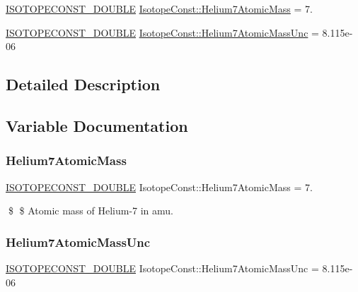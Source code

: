\begin{DoxyCompactItemize}
\item 
\mbox{\hyperlink{group___isotope_const-_macros_ga8f45a7272ce02c0b4c65c44636ed719a}{I\+S\+O\+T\+O\+P\+E\+C\+O\+N\+S\+T\+\_\+\+D\+O\+U\+B\+LE}} \mbox{\hyperlink{group___isotope_const-_helium-_he7_gae9b33ba21d0483be0a5607304cfce937}{Isotope\+Const\+::\+Helium7\+Atomic\+Mass}} = 7.
\item 
\mbox{\hyperlink{group___isotope_const-_macros_ga8f45a7272ce02c0b4c65c44636ed719a}{I\+S\+O\+T\+O\+P\+E\+C\+O\+N\+S\+T\+\_\+\+D\+O\+U\+B\+LE}} \mbox{\hyperlink{group___isotope_const-_helium-_he7_ga6b1357a01df5c09a990eab441534dc7e}{Isotope\+Const\+::\+Helium7\+Atomic\+Mass\+Unc}} = 8.\+115e-\/06
\end{DoxyCompactItemize}


\subsection{Detailed Description}


\subsection{Variable Documentation}
\mbox{\label{group___isotope_const-_helium-_he7_gae9b33ba21d0483be0a5607304cfce937}} 
\subsubsection{\texorpdfstring{Helium7\+Atomic\+Mass}{Helium7AtomicMass}}
{\footnotesize\ttfamily \mbox{\hyperlink{group___isotope_const-_macros_ga8f45a7272ce02c0b4c65c44636ed719a}{I\+S\+O\+T\+O\+P\+E\+C\+O\+N\+S\+T\+\_\+\+D\+O\+U\+B\+LE}} Isotope\+Const\+::\+Helium7\+Atomic\+Mass = 7.}

\$ \$ Atomic mass of Helium-\/7 in amu. \mbox{\label{group___isotope_const-_helium-_he7_ga6b1357a01df5c09a990eab441534dc7e}} 
\subsubsection{\texorpdfstring{Helium7\+Atomic\+Mass\+Unc}{Helium7AtomicMassUnc}}
{\footnotesize\ttfamily \mbox{\hyperlink{group___isotope_const-_macros_ga8f45a7272ce02c0b4c65c44636ed719a}{I\+S\+O\+T\+O\+P\+E\+C\+O\+N\+S\+T\+\_\+\+D\+O\+U\+B\+LE}} Isotope\+Const\+::\+Helium7\+Atomic\+Mass\+Unc = 8.\+115e-\/06}


